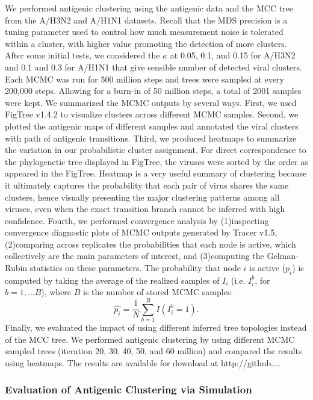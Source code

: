 \documentclass[11pt,oneside,letterpaper]{article}
\begin{document}
	
We performed antigenic clustering using the antigenic data and the MCC tree from the A/H3N2 and A/H1N1 datasets. 
Recall that the MDS precision is a tuning parameter used to control how much measurement noise is tolerated within a cluster, with higher value promoting the detection of more clusters. 
After some initial tests, we considered the $\kappa$ at 0.05, 0.1, and 0.15 for A/H3N2 and 0.1 and 0.3 for A/H1N1 that give sensible number of detected viral clusters.  
Each MCMC was run for 500 million steps and trees were sampled at every 200,000 steps. 
Allowing for a burn-in of 50 million steps, a total of 2001 samples were kept.
We summarized the MCMC outputs by several ways. 
First, we used FigTree v1.4.2 to visualize clusters across different  MCMC samples. 
Second, we plotted the antigenic maps of different samples and annotated the viral clusters with path of antigenic transitions. 
Third, we produced heatmaps to summarize the variation in our probabilistic cluster assignment. 
For direct correspondence to the phylogenetic tree displayed in FigTree, the viruses were sorted by the order as appeared in the FigTree.
Heatmap is a very useful summary of clustering because it ultimately captures the probability that each pair of virus shares the same clusters, hence visually presenting the major clustering patterns among all viruses, even when the exact transition branch cannot be inferred with high confidence. %
Fourth, we performed convergence analysis by (1)inspecting convergence diagnostic plots of MCMC outputs generated by Tracer v1.5, (2)comparing across replicates the probabilities that each node is active, which collectively are the main parameters of interest, and (3)computing the Gelman-Rubin statistics on these parameters. 
The probability that node $i$ is active ($p_i$) is computed by taking the average of the realized samples of $I_i$ (i.e. $I_i^b$, for $b=1,...B$), where $B$ is the number of stored MCMC samples.
\begin{equation}
 \hat{p_i} = \frac{1}{N} \sum_{b=1}^{B} I(I_i^b  = 1).
\end{equation}
Finally, we evaluated the impact of using different inferred tree topologies instead of the MCC tree. 
We performed antigenic clustering by using different MCMC sampled trees (iteration 20, 30, 40, 50, and 60 million) and compared the results using heatmaps.
The results are available for download at http://github....


\subsubsection*{Evaluation of Antigenic Clustering via Simulation}
\end{document}
